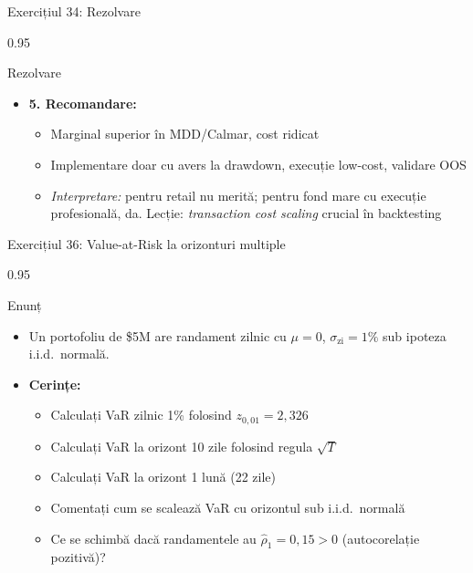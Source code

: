 \documentclass[9pt, aspectratio=169, t]{beamer}
\begin{document}
\begin{frame}[shrink=30]{Exercițiul 34: Rezolvare}
\begin{cminipage}{0.95\textwidth}
\begin{exampleblock}{Rezolvare}
\begin{itemize}
\begin{itemize}
    \end{itemize}
    \item \textbf{5. Recomandare:}
    \begin{itemize}\setlength{\itemsep}{0pt}
        \item Marginal superior în MDD/Calmar, cost ridicat
        \item Implementare doar cu avers la drawdown, execuție low-cost, validare OOS
        \item \textit{Interpretare:} pentru retail nu merită; pentru fond mare cu execuție profesională, da. Lecție: \emph{transaction cost scaling} crucial în backtesting
    \end{itemize}
\end{itemize}
\end{exampleblock}
\end{cminipage}
\end{frame}

\begin{frame}[shrink=25]{Exercițiul 36: Value-at-Risk la orizonturi multiple}
\begin{cminipage}{0.95\textwidth}
\begin{block}{Enunț}
\begin{itemize}\setlength{\itemsep}{0pt}
    \item Un portofoliu de \$5M are randament zilnic cu $\mu = 0$, $\sigma_{\text{zi}} = 1\%$ sub ipoteza i.i.d.~normală.
    \item \textbf{Cerințe:}
    \begin{itemize}\setlength{\itemsep}{0pt}
        \item Calculați VaR zilnic 1\% folosind $z_{0{,}01} = 2{,}326$
        \item Calculați VaR la orizont 10 zile folosind regula $\sqrt{T}$
        \item Calculați VaR la orizont 1 lună (22 zile)
        \item Comentați cum se scalează VaR cu orizontul sub i.i.d.~normală
        \item Ce se schimbă dacă randamentele au $\hat\rho_1 = 0{,}15 > 0$ (autocorelație pozitivă)?
    \end{itemize}
\end{itemize}
\end{block}
\end{cminipage}
\end{frame}
\end{document}
